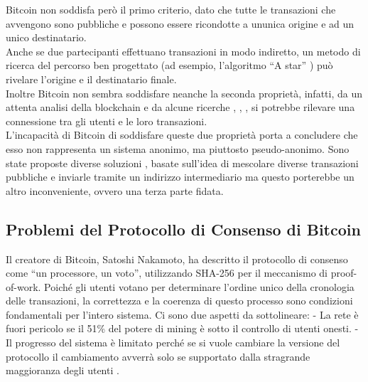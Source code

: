 Bitcoin non soddisfa però il primo criterio, dato che tutte le
transazioni che avvengono sono pubbliche e possono essere ricondotte a
un\textquotesingle unica origine e ad un unico destinatario.\\
Anche se due partecipanti effettuano transazioni in modo indiretto, un
metodo di ricerca del percorso ben progettato (ad esempio, l'algoritmo
``A star'' \cite{hart1968formal}) può rivelare l'origine e il destinatario
finale.\\
Inoltre Bitcoin non sembra soddisfare neanche la seconda proprietà,
infatti, da un attenta analisi della blockchain e da alcune ricerche
\cite{reid2013analysis}, \cite{analysis_bitcoin}, \cite{ron2013quantitative}, si potrebbe rilevare una
connessione tra gli utenti e le loro transazioni.\\
L'incapacità di Bitcoin di soddisfare queste due proprietà porta a
concludere che esso non rappresenta un sistema anonimo, ma piuttosto
pseudo-anonimo. Sono state proposte diverse soluzioni \cite{mixing_services},
\cite{secure_multiparty} basate sull'idea di mescolare diverse transazioni pubbliche
e inviarle tramite un indirizzo intermediario ma questo porterebbe un
altro inconveniente, ovvero una terza parte fidata.

\subsection{Problemi del Protocollo di Consenso di
Bitcoin}\label{problemi-del-protocollo-di-consenso-di-bitcoin}

Il creatore di Bitcoin, Satoshi Nakamoto, ha descritto il protocollo di
consenso come ``un processore, un voto'', utilizzando SHA-256 per il
meccanismo di proof-of-work. Poiché gli utenti votano per determinare
l'ordine unico della cronologia delle transazioni, la correttezza e la
coerenza di questo processo sono condizioni fondamentali per l'intero
sistema. Ci sono due aspetti da sottolineare: - La rete è fuori pericolo
se il 51\% del potere di mining è sotto il controllo di utenti onesti. -
Il progresso del sistema è limitato perché se si vuole cambiare la
versione del protocollo il cambiamento avverrà solo se supportato dalla
stragrande maggioranza degli utenti \cite{bip_34}.

